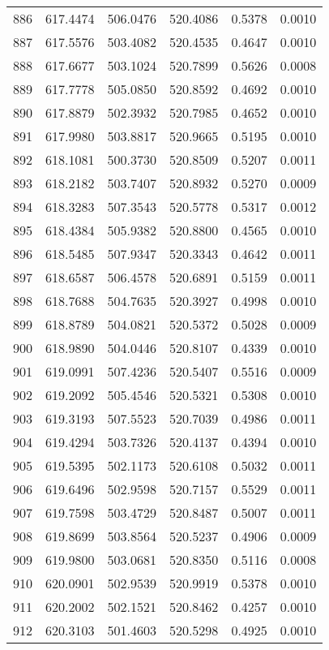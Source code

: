 \documentclass{article}
\begin{document}
\begin{longtable}{|c|c|c|c|c|c|}
886 & 617.4474 & 506.0476 & 520.4086 & 0.5378 & 0.0010 \\
887 & 617.5576 & 503.4082 & 520.4535 & 0.4647 & 0.0010 \\
888 & 617.6677 & 503.1024 & 520.7899 & 0.5626 & 0.0008 \\
889 & 617.7778 & 505.0850 & 520.8592 & 0.4692 & 0.0010 \\
890 & 617.8879 & 502.3932 & 520.7985 & 0.4652 & 0.0010 \\
891 & 617.9980 & 503.8817 & 520.9665 & 0.5195 & 0.0010 \\
892 & 618.1081 & 500.3730 & 520.8509 & 0.5207 & 0.0011 \\
893 & 618.2182 & 503.7407 & 520.8932 & 0.5270 & 0.0009 \\
894 & 618.3283 & 507.3543 & 520.5778 & 0.5317 & 0.0012 \\
895 & 618.4384 & 505.9382 & 520.8800 & 0.4565 & 0.0010 \\
896 & 618.5485 & 507.9347 & 520.3343 & 0.4642 & 0.0011 \\
897 & 618.6587 & 506.4578 & 520.6891 & 0.5159 & 0.0011 \\
898 & 618.7688 & 504.7635 & 520.3927 & 0.4998 & 0.0010 \\
899 & 618.8789 & 504.0821 & 520.5372 & 0.5028 & 0.0009 \\
900 & 618.9890 & 504.0446 & 520.8107 & 0.4339 & 0.0010 \\
901 & 619.0991 & 507.4236 & 520.5407 & 0.5516 & 0.0009 \\
902 & 619.2092 & 505.4546 & 520.5321 & 0.5308 & 0.0010 \\
903 & 619.3193 & 507.5523 & 520.7039 & 0.4986 & 0.0011 \\
904 & 619.4294 & 503.7326 & 520.4137 & 0.4394 & 0.0010 \\
905 & 619.5395 & 502.1173 & 520.6108 & 0.5032 & 0.0011 \\
906 & 619.6496 & 502.9598 & 520.7157 & 0.5529 & 0.0011 \\
907 & 619.7598 & 503.4729 & 520.8487 & 0.5007 & 0.0011 \\
908 & 619.8699 & 503.8564 & 520.5237 & 0.4906 & 0.0009 \\
909 & 619.9800 & 503.0681 & 520.8350 & 0.5116 & 0.0008 \\
910 & 620.0901 & 502.9539 & 520.9919 & 0.5378 & 0.0010 \\
911 & 620.2002 & 502.1521 & 520.8462 & 0.4257 & 0.0010 \\
912 & 620.3103 & 501.4603 & 520.5298 & 0.4925 & 0.0010 \\

\end{longtable}
\end{document}
